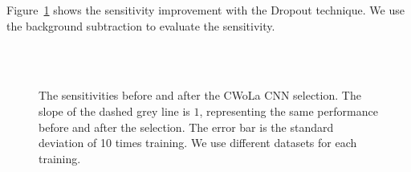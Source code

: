 \documentclass[12pt]{article}
\begin{document}
        Figure~\ref{fig:sensitivity_improvement_background_subtraction_dropout_0_35} shows the sensitivity improvement with the Dropout technique. We use the background subtraction to evaluate the sensitivity.
        \begin{figure}[htpb]
            \centering
             \\
             \\
            \caption{The sensitivities before and after the CWoLa CNN selection. The slope of the dashed grey line is $1$, representing the same performance before and after the selection. The error bar is the standard deviation of 10 times training. We use different datasets for each training.}
            \label{fig:sensitivity_improvement_background_subtraction_dropout_0_35}
        \end{figure}
\end{document}
